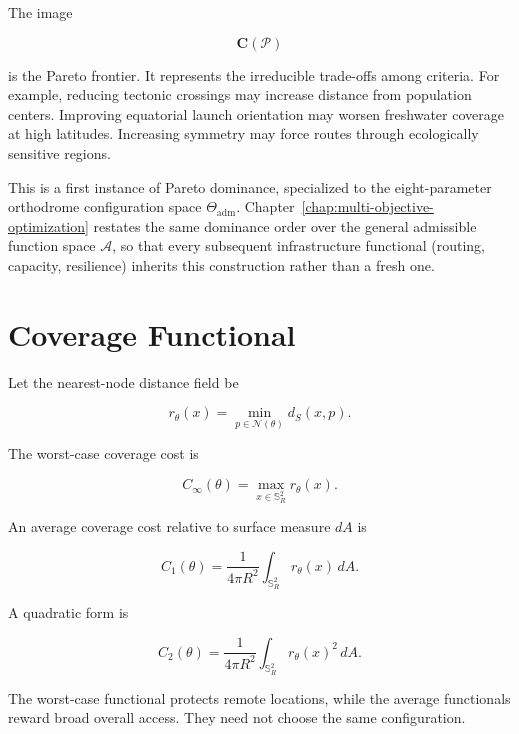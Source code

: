 \documentclass[11pt,fleqn]{book}
\numberwithin{equation}{chapter}
\theoremstyle{plain}
\theoremstyle{definition}
\theoremstyle{remark}
\newcommand{\Sphere}{\mathbb{S}^{2}}
\newcommand{\Nset}{\mathcal{N}}
\begin{document}
The image

\begin{equation}
    \mathbf{C}(\mathcal{P})
\end{equation}

is the Pareto frontier. It represents the irreducible trade-offs among criteria. For example, reducing tectonic crossings may increase distance from population centers. Improving equatorial launch orientation may worsen freshwater coverage at high latitudes. Increasing symmetry may force routes through ecologically sensitive regions.

This is a first instance of Pareto dominance, specialized to the eight-parameter orthodrome configuration space \(\Theta_{\mathrm{adm}}\). Chapter~\ref{chap:multi-objective-optimization} restates the same dominance order over the general admissible function space \(\mathcal A\), so that every subsequent infrastructure functional (routing, capacity, resilience) inherits this construction rather than a fresh one.

\section{Coverage Functional}

Let the nearest-node distance field be

\begin{equation}
    r_\theta(x)
    =
    \min_{p\in\Nset(\theta)}
    d_S(x,p).
\end{equation}

The worst-case coverage cost is

\begin{equation}
    C_{\infty}(\theta)
    =
    \max_{x\in\Sphere_R}
    r_\theta(x).
\end{equation}

An average coverage cost relative to surface measure \(dA\) is

\begin{equation}
    C_1(\theta)
    =
    \frac{1}{4\pi R^2}
    \int_{\Sphere_R}
    r_\theta(x)\,dA.
\end{equation}

A quadratic form is

\begin{equation}
    C_2(\theta)
    =
    \frac{1}{4\pi R^2}
    \int_{\Sphere_R}
    r_\theta(x)^2\,dA.
\end{equation}

The worst-case functional protects remote locations, while the average functionals reward broad overall access. They need not choose the same configuration.
\end{document}
